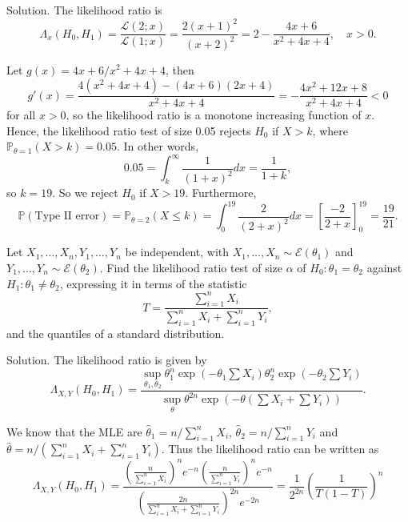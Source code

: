 Solution. The likelihood ratio is
\begin{equation}
\Lambda_x(H_0,H_1) = \frac{\mathcal{L}(2;x)}{\mathcal{L}(1;x)} = \frac{2(x+1)^2}{(x+2)^2} = 2- \frac{4x+6}{x^2+4x+4},\quad x>0.
\end{equation}

Let $g(x)={4x+6}/{x^2+4x+4}$, then
\begin{equation}
g'(x) = \frac{4(x^2+4x+4) - (4x+6)(2x+4)}{x^2+4x+4} = - \frac{4x^2+12x+8}{x^2+4x+4} <0
\end{equation}
for all $x>0$, so the likelihood ratio is a monotone increasing function of $x$. Hence, the likelihood ratio test of size 0.05 rejects $H_0$ if $X>k$, where $\mathbb{P}_{\theta=1}(X>k)=0.05$. In other words,
\begin{equation}
0.05 = \int^\infty_k \frac{1}{(1+x)^2}dx = \frac{1}{1+k},
\end{equation}
so $k=19$. So we reject $H_0$ if $X>19$. Furthermore,
\begin{equation}
\mathbb{P}(\text{Type II error})= \mathbb{P}_{\theta=2}(X\leq k) = \int^{19}_0 \frac{2}{(2+x)^2}dx = \left[\frac{-2}{2+x}\right]^{19}_0=\frac{19}{21}.
\end{equation}





\item Let $X_1,\dots,X_n,Y_1,\dots,Y_n$ be independent, with $X_1,\dots,X_n\sim\mathcal{E}(\theta_1)$ and $Y_1,\dots,Y_n\sim\mathcal{E}(\theta_2)$. Find the likelihood ratio test of size $\alpha$ of $H_0:\theta_1=\theta_2$ against $H_1:\theta_1\neq\theta_2$, expressing it in terms of the statistic
\begin{equation}
T=\frac{\sum^n_{i=1}X_i}{\sum^n_{i=1}X_i+\sum^n_{i=1}Y_i},
\end{equation}
and the quantiles of a standard distribution.



Solution. The likelihood ratio is given by
\begin{equation}
\Lambda_{X,Y}(H_0,H_1) = \frac{\sup_{\theta_1,\theta_2}\theta_1^n\exp(-\theta_1\sum X_i)\theta_2^n\exp(-\theta_2\sum Y_i)}{\sup_{\theta}\theta^{2n}\exp(-\theta(\sum X_i+\sum Y_i))}.
\end{equation}

We know that the MLE are $\hat{\theta}_1=n/\sum^n_{i=1}X_i$, $\hat{\theta}_2=n/\sum^n_{i=1}Y_i$ and $\hat{\theta}=n/\left(\sum^n_{i=1}X_i+ \sum^n_{i=1}Y_i\right)$. Thus the likelihood ratio can be written as
\begin{equation}
\Lambda_{X,Y}(H_0,H_1) = \frac{\left(\frac{n}{\sum^n_{i=1}X_i}\right)^ne^{-n}\left(\frac{n}{\sum^n_{i=1}Y_i}\right)^ne^{-n}}{\left(\frac{2n}{\sum^n_{i=1}X_i+\sum^n_{i=1}Y_i}\right)^{2n}e^{-2n}} = \frac{1}{2^{2n}}\left(\frac{1}{T(1-T)}\right)^n
\end{equation}

